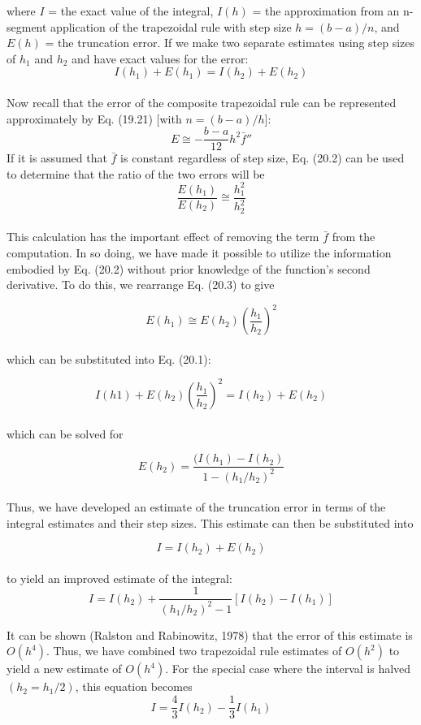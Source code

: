 \documentclass[../main.tex]{subfiles}
\begin{document}
where $I$ = the exact value of the integral, $I(h)$ = the approximation from an n-segment
application of the trapezoidal rule with step size $h = (b − a)/n$, and $E(h)$ = the truncation
error. If we make two separate estimates using step sizes of $h_1$ and $h_2$ and have exact values for the error:\\
\begin{equation}
	\tag{20.1}
	I(h_1)+E(h_1)=I(h_2)+E(h_2)
\end{equation}\\
Now recall that the error of the composite trapezoidal rule can be represented approximately by Eq. (19.21) [with $n = (b − a)/h$]:
\begin{equation}
	\tag{20.2}
	E\cong-\dfrac{b-a}{12}h^{2}\bar{f}''
\end{equation}
If it is assumed that $\bar{f}$ is constant regardless of step size, Eq. (20.2) can be used to determine that the ratio of the two errors will be
\begin{equation}
	\tag{20.3}
	\dfrac{E(h_1)}{E(h_2)}\cong\dfrac{h^{2}_{1}}{h^{2}_{2}}
\end{equation}\\
This calculation has the important effect of removing the term $\bar{f}$ from the computation.
In so doing, we have made it possible to utilize the information embodied by Eq. (20.2) without prior knowledge of the function's second derivative. To do this, we rearrange
Eq. (20.3) to give

	$$E(h_1) \cong E(h_2)\left(\dfrac{h_1}{h_2} \right)^2$$\\
which can be substituted into Eq. (20.1):

	$$I(h1)+E(h_2)\left(\dfrac{h_1}{h_2} \right)^2=I(h_2)+E(h_2)$$\\
which can be solved for

	$$E(h_2)=\dfrac{(I(h_1)-I(h_2)}{1-(h_1/h_2)^2}$$\\
Thus, we have developed an estimate of the truncation error in terms of the integral estimates and their step sizes. This estimate can then be substituted into

	$$I=I(h_2)+E(h_2)$$\\
to yield an improved estimate of the integral:
\begin{equation}
	\tag{20.4}
	I=I(h_2)+\dfrac{1}{(h_1/h_2)^2-1}[I(h_2)-I(h_1)]
\end{equation}

It can be shown (Ralston and Rabinowitz, 1978) that the error of this estimate is
$O(h^4)$. Thus, we have combined two trapezoidal rule estimates of $O(h^2)$ to yield a new estimate of $O(h^4)$. For the special case where the interval is halved $(h_2 = h_1/2)$, this equation becomes
\begin{equation}
	\tag{20.5}
	I=\dfrac{4}{3}I(h_2)-\dfrac{1}{3}I(h_1)
\end{equation}
\end{document}
